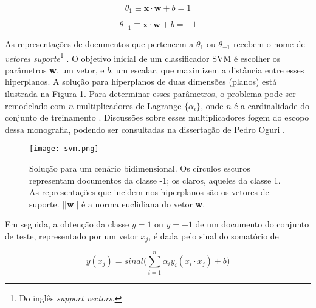 \begin{equation}
\label{theta1:svm}
\ensuremath{\theta_1 \equiv } \textbf{x} \ensuremath{\cdot} \textbf{w} + \ensuremath{b} = 1
\end{equation}

\begin{equation}
\label{thetamenos1:svm}
\ensuremath{\theta_{-1} \equiv } \textbf{x} \ensuremath{\cdot} \textbf{w} + \ensuremath{b} = -1
\end{equation}

As representações de documentos que pertencem a \ensuremath{\theta_1} ou \ensuremath{\theta_{-1}} recebem o nome de \emph{vetores suporte}\footnote{Do inglês \emph{support vectors}.} \cite{mono-puc}. O objetivo inicial de um classificador SVM é escolher os parâmetros \textbf{w}, um vetor, e \ensuremath{b}, um escalar, que maximizem a distância entre esses hiperplanos. A solução para hiperplanos de duas dimensões (planos) está ilustrada na Figura \ref{svm}. Para determinar esses parâmetros, o problema pode ser remodelado com \ensuremath{n} multiplicadores de Lagrange \ensuremath{\{\alpha_i\}}, onde \ensuremath{n} é a cardinalidade do conjunto de treinamento \cite{mono-puc}. Discussões sobre esses multiplicadores fogem do escopo dessa monografia, podendo ser consultadas na dissertação de Pedro Oguri \cite{mono-puc}. 

\begin{figure}[t]
  \centering %
  \texttt{[image: svm.png]}\\
  \caption{Solução para um cenário bidimensional. Os círculos escuros representam documentos da classe -1; os claros, aqueles da classe 1. As representações que incidem nos hiperplanos são os vetores de suporte. \ensuremath{||}\textbf{w}\ensuremath{||} é a norma euclidiana do vetor \textbf{w}.}
  \label{svm}
\end{figure}

Em seguida, a obtenção da classe \ensuremath{y = 1} ou \ensuremath{y = -1} de um documento do conjunto de teste, representado por um vetor \ensuremath{x_j}, é dada pelo sinal do somatório de \cite{mono-puc} 


\begin{equation}
\label{result:svm}
\ensuremath{y(x_j) = sinal\bigg(\sum_{i = 1}^n \alpha_iy_i(x_i \cdot x_j) + b\bigg)} %
\end{equation}

